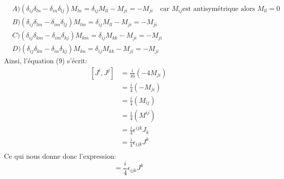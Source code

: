 \documentclass[12pt, a4paper]{article}
\begin{document}
 \begin{equation}
 	\begin{split}
 		&A)(\delta_{ij}\delta_{ln}-\delta_{in}\delta_{lj})M_{l n}
 		= \delta_{ij}M_{l l}-M_{j i}= -M_{j i} \quad \text{car \(M_{i j}\)est antisymétrique alors \(M_{l l}=0\)}\\
 		&B)(\delta_{ij}\delta_{lm}-\delta_{im}\delta_{lj})M_{l m}
 		=  \delta_{ij}M_{l l}-M_{j i}= -M_{j i}\\
 		&C)(\delta_{ij}\delta_{km}-\delta_{im}\delta_{kj})M_{k m}
 		=  \delta_{ij}M_{k k}-M_{j i}= -M_{j i}\\
 		&D)(\delta_{ij}\delta_{kn}-\delta_{in}\delta_{kj})M_{k n}
 		=  \delta_{ij}M_{k k}-M_{j i}= -M_{j i}
 	\end{split}
 \end{equation}
 Ainsi, l'équation (9) s'écrit:
 \begin{equation}
 	\begin{split}
 		[J^{i},J^{j}]
 		&=\frac{i}{16}(-4M_{j i})\\
 		&=\frac{i}{4}(-M_{j i})\\
 		&=\frac{i}{4}(M_{i j})\\
 		&=\frac{i}{4}(M^{i j})\\
 		&=\frac{i}{4}\epsilon^{ijk}J_{k}\\
 		&=\frac{i}{4}\epsilon_{ijk}J^{k}\\
 		\end{split}
 \end{equation}
 Ce qui nous donne donc l'expression:
 \begin{equation}
 	[J^{i},J^{j}]=\frac{i}{4}\epsilon_{ijk}J^{k}
 \end{equation}
 
\end{document}
